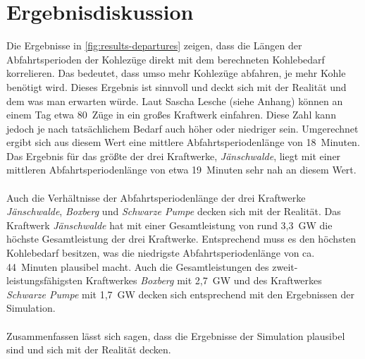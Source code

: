 \section{Ergebnisdiskussion}

Die Ergebnisse in \autoref{fig:results-departures} zeigen, dass die Längen der Abfahrtsperioden der Kohlezüge direkt mit dem berechneten Kohlebedarf korrelieren. Das bedeutet, dass umso mehr Kohlezüge abfahren, je mehr Kohle benötigt wird. Dieses Ergebnis ist sinnvoll und deckt sich mit der Realität und dem was man erwarten würde. Laut Sascha Lesche (siehe Anhang) können an einem Tag etwa 80~Züge in ein großes Kraftwerk einfahren. Diese Zahl kann jedoch je nach tatsächlichem Bedarf auch höher oder niedriger sein. Umgerechnet ergibt sich aus diesem Wert eine mittlere Abfahrtsperiodenlänge von 18~Minuten. Das Ergebnis für das größte der drei Kraftwerke, \emph{Jänschwalde}, liegt mit einer mittleren Abfahrtsperiodenlänge von etwa 19~Minuten sehr nah an diesem Wert. \\
\\
Auch die Verhältnisse der Abfahrtsperiodenlänge der drei Kraftwerke \emph{Jänschwalde}, \emph{Boxberg} und \emph{Schwarze Pumpe} decken sich mit der Realität. Das Kraftwerk \emph{Jänschwalde} hat mit einer Gesamtleistung von rund 3,3~GW die höchste Gesamtleistung der drei Kraftwerke. Entsprechend muss es den höchsten Kohlebedarf besitzen, was die niedrigste Abfahrtsperiodenlänge von ca. 44~Minuten plausibel macht. Auch die Gesamtleistungen des zweit-leistungsfähigsten Kraftwerkes \emph{Boxberg} mit 2,7~GW und des Kraftwerkes \emph{Schwarze Pumpe} mit 1,7~GW decken sich entsprechend mit den Ergebnissen der Simulation. \cite{noauthor_bundesnetzagentur_nodate}\\
\\
Zusammenfassen lässt sich sagen, dass die Ergebnisse der Simulation plausibel sind und sich mit der Realität decken.
